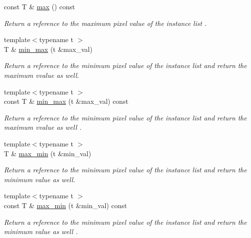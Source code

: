 \begin{Indent}
\begin{DoxyCompactItemize}
\mbox{\label{structcimg__library__suffixed_1_1CImgList_a633e7aed9dbc54e49142a00e2c514723}} 
const T \& \hyperlink{structcimg__library__suffixed_1_1CImgList_a633e7aed9dbc54e49142a00e2c514723}{max} () const
\begin{DoxyCompactList}\small\item\em Return a reference to the maximum pixel value of the instance list . \end{DoxyCompactList}\item 
{\footnotesize template$<$typename t $>$ }\\T \& \hyperlink{structcimg__library__suffixed_1_1CImgList_ae32eac5622ec6c2b903c63352048708d}{min\+\_\+max} (t \&max\+\_\+val)
\begin{DoxyCompactList}\small\item\em Return a reference to the minimum pixel value of the instance list and return the maximum vvalue as well. \end{DoxyCompactList}\item 
{\footnotesize template$<$typename t $>$ }\\const T \& \hyperlink{structcimg__library__suffixed_1_1CImgList_a97a9a50eeea12bde9a27e1091dffa358}{min\+\_\+max} (t \&max\+\_\+val) const
\begin{DoxyCompactList}\small\item\em Return a reference to the minimum pixel value of the instance list and return the maximum vvalue as well . \end{DoxyCompactList}\item 
{\footnotesize template$<$typename t $>$ }\\T \& \hyperlink{structcimg__library__suffixed_1_1CImgList_a13bb9815743d119b9f3b469db2403937}{max\+\_\+min} (t \&min\+\_\+val)
\begin{DoxyCompactList}\small\item\em Return a reference to the minimum pixel value of the instance list and return the minimum value as well. \end{DoxyCompactList}\item 
\mbox{\label{structcimg__library__suffixed_1_1CImgList_a75fb5633d1b4b043359a4982c97e4f93}} 
{\footnotesize template$<$typename t $>$ }\\const T \& \hyperlink{structcimg__library__suffixed_1_1CImgList_a75fb5633d1b4b043359a4982c97e4f93}{max\+\_\+min} (t \&min\+\_\+val) const
\begin{DoxyCompactList}\small\item\em Return a reference to the minimum pixel value of the instance list and return the minimum value as well . \end{DoxyCompactList}\end{DoxyCompactItemize}
\end{Indent}
